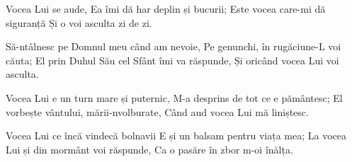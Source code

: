 \beginchorus
Vocea Lui se aude,
Ea îmi dă har deplin și bucurii;
Este vocea care-mi dă siguranță
Și o voi asculta zi de zi.
\endchorus

\beginverse
Să-ntâlnesc pe Domnul meu când am nevoie,
Pe genunchi, în rugăciune-L voi căuta;
El prin Duhul Său cel Sfânt îmi va răspunde,
Și oricând vocea Lui voi asculta.
\endverse

\beginverse
Vocea Lui e un turn mare și puternic,
M-a desprins de tot ce e pământesc;
El vorbește vântului, mării-nvolburate,
Când aud vocea Lui mă liniștesc.
\endverse

\beginverse
Vocea Lui ce încă vindecă bolnavii
E și un balsam pentru viața mea;
La vocea Lui și din mormânt voi răspunde,
Ca o pasăre în zbor m-oi înălța.
\endverse
\endsong